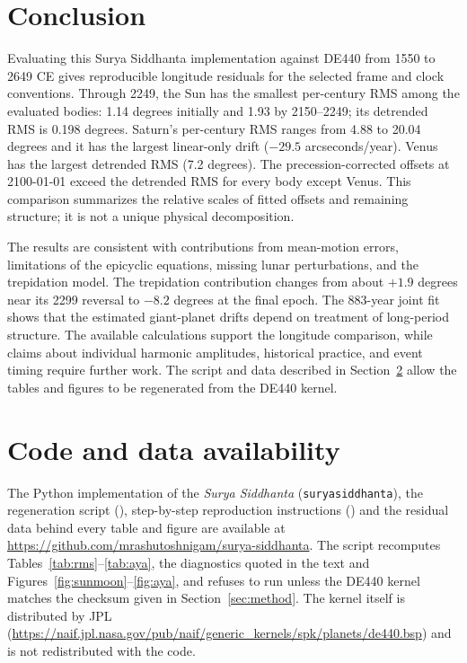 \documentclass[11pt,a4paper]{article}
\newcommand{\SuSi}{\textit{Surya Siddhanta}}
\newcommand{\file}[1]{\texttt{#1}}
\begin{document}
\section{Conclusion}
\label{sec:conclusion}

Evaluating this Surya Siddhanta implementation against DE440 from 1550 to 2649 CE gives reproducible longitude residuals for the selected frame and clock conventions. Through 2249, the Sun has the smallest per-century RMS among the evaluated bodies: 1.14 degrees initially and 1.93 by 2150--2249; its detrended RMS is 0.198 degrees. Saturn's per-century RMS ranges from 4.88 to 20.04 degrees and it has the largest linear-only drift ($-29.5$ arcseconds/year). Venus has the largest detrended RMS (7.2 degrees). The precession-corrected offsets at 2100-01-01 exceed the detrended RMS for every body except Venus. This comparison summarizes the relative scales of fitted offsets and remaining structure; it is not a unique physical decomposition.

The results are consistent with contributions from mean-motion errors, limitations of the epicyclic equations, missing lunar perturbations, and the trepidation model. The trepidation contribution changes from about $+1.9$ degrees near its 2299 reversal to $-8.2$ degrees at the final epoch. The 883-year joint fit shows that the estimated giant-planet drifts depend on treatment of long-period structure. The available calculations support the longitude comparison, while claims about individual harmonic amplitudes, historical practice, and event timing require further work. The script and data described in Section~\ref{sec:availability} allow the tables and figures to be regenerated from the DE440 kernel.

\section{Code and data availability}
\label{sec:availability}

\begin{sloppypar}
The Python implementation of the \SuSi{} (\file{suryasiddhanta}), the regeneration script (), step-by-step reproduction instructions () and the residual data behind every table and figure are available at \url{https://github.com/mrashutoshnigam/surya-siddhanta}. The script recomputes Tables~\ref{tab:rms}--\ref{tab:aya}, the diagnostics quoted in the text and Figures~\ref{fig:sunmoon}--\ref{fig:aya}, and refuses to run unless the DE440 kernel matches the checksum given in Section~\ref{sec:method}. The kernel itself is distributed by JPL (\url{https://naif.jpl.nasa.gov/pub/naif/generic_kernels/spk/planets/de440.bsp}) and is not redistributed with the code.
\end{sloppypar}
\end{document}
